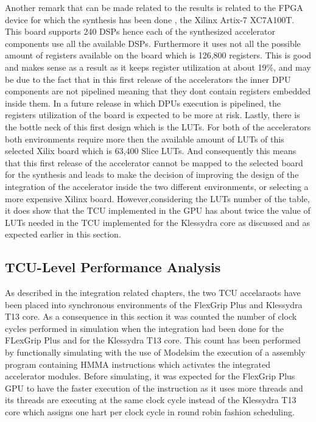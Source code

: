 Another remark that can be made related to the results is related to the FPGA device for which the synthesis has been done , the Xilinx Artix-7 XC7A100T. This board supports 240 DSPs hence each of the synthesized accelerator components use all the available DSPs. Furthermore it uses not all the possible amount of registers available on the board which is 126,800 registers. This is good and makes sense as a result as it keeps register utilization at about 19\%, and may be due to the fact that in this first release of the accelerators the inner DPU components are not pipelined meaning that they dont contain registers embedded inside them. In a future release in which DPUs execution is pipelined, the registers utilization of the board is expected to be more at risk. Lastly, there is the bottle neck of this first design which is the LUTs. For both of the accelerators both environments require more then the available amount of LUTs of this selected Xilix board which is 63,400 Slice LUTs. And consequently this means that this first release of the accelerator cannot be mapped to the selected board for the synthesis and leads to make the decision of improving the design of the integration of the accelerator inside the two different environments, or selecting a more expensive Xilinx board. However,considering the LUTs number of the table, it does show that the TCU implemented in the GPU has about twice the value of LUTs needed in the TCU implemented for the Klessydra core as discussed and as expected earlier in this section.

\subsection{TCU-Level Performance Analysis}

As described in the integration related chapters, the two TCU accelaraots have been placed into synchronous environments of the FlexGrip Plus and Klessydra T13 core. As a consequence in this section it was counted the number of clock cycles performed in simulation when the integration had been done for the FLexGrip Plus and for the Klessydra T13 core. This count has been performed by functionally simulating with the use of Modelsim the execution of a assembly program containing HMMA instructions which activates the integrated accelerator modules. Before simulating, it was expected for the FlexGrip Plus GPU to have the faster execution of the instruction as it uses more threads and its threads are executing at the same clock cycle instead of the Klessydra T13 core which assigns one hart per clock cycle in round robin fashion scheduling. 

